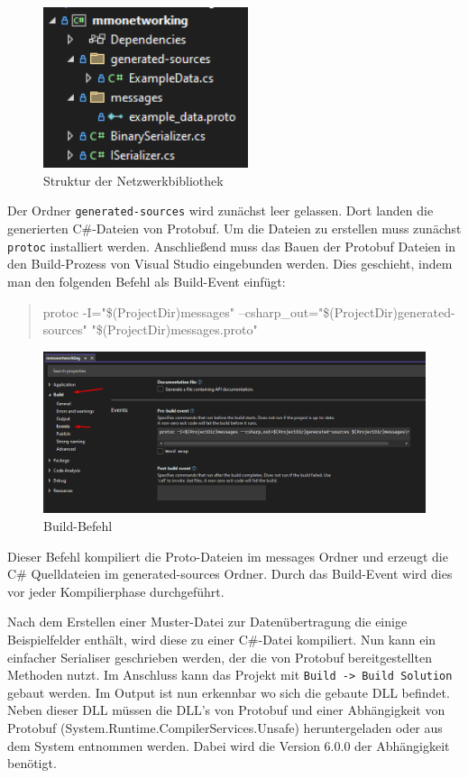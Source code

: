 \begin{figure}[!h]
	\centering
	\includegraphics[width=6cm]{figures/networkingstructure.png}
	\caption{Struktur der Netzwerkbibliothek}
	\label{fig:networkingstructure}
\end{figure}

Der Ordner \verb|generated-sources| wird zunächst leer gelassen. Dort landen die generierten C\#-Dateien von Protobuf. Um die Dateien zu erstellen muss zunächst \verb|protoc| installiert werden. Anschließend muss das Bauen der Protobuf Dateien in den Build-Prozess von Visual Studio eingebunden werden. Dies geschieht, indem man den folgenden Befehl als Build-Event einfügt:

\begin{quote}
	\centering
	protoc -I="\$(ProjectDir)messages" --csharp\_out="\$(ProjectDir)generated-sources" "\$(ProjectDir)messages\*.proto"
\end{quote}

\begin{figure}[!h]
	\centering
	\includegraphics[width=16cm]{figures/networkingprotobuild.png}
	\caption{Build-Befehl}
	\label{fig:networkingbuildcommand}
\end{figure}

Dieser Befehl kompiliert die Proto-Dateien im messages Ordner und erzeugt die C\# Quelldateien im generated-sources Ordner. Durch das Build-Event wird dies vor jeder Kompilierphase durchgeführt.

Nach dem Erstellen einer Muster-Datei zur Datenübertragung die einige Beispielfelder enthält, wird diese zu einer C\#-Datei kompiliert. Nun kann ein einfacher Serialiser geschrieben werden, der die von Protobuf bereitgestellten Methoden nutzt. Im Anschluss kann das Projekt mit \verb|Build -> Build Solution| gebaut werden. Im Output ist nun erkennbar wo sich die gebaute DLL befindet. Neben dieser DLL müssen die DLL's von Protobuf und einer Abhängigkeit von Protobuf (System.Runtime.CompilerServices.Unsafe) heruntergeladen oder aus dem System entnommen werden. Dabei wird die Version 6.0.0 der Abhängigkeit benötigt.

